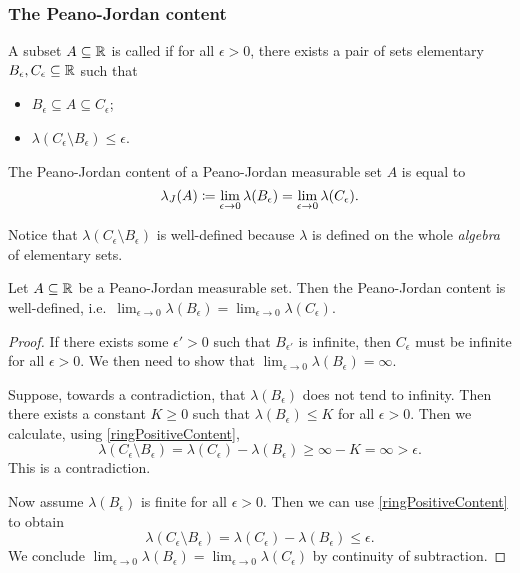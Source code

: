 \subsubsection{The Peano-Jordan content}
\begin{definition}
A subset $A\subseteq \mathbb{R}$ is called  if for all $\epsilon > 0$, there exists a pair of sets elementary $B_\epsilon, C_\epsilon \subseteq \mathbb{R}$ such that
\begin{itemize}
\item $B_\epsilon \subseteq A\subseteq C_\epsilon$;
\item $\lambda(C_\epsilon \setminus B_\epsilon) \leq \epsilon$.
\end{itemize}
The Peano-Jordan content of a Peano-Jordan measurable set $A$ is equal to
\[ \lambda_J(A) \coloneqq \lim_{\epsilon\to 0}\lambda(B_\epsilon) = \lim_{\epsilon\to 0}\lambda(C_\epsilon). \]
\end{definition}
Notice that $\lambda(C_\epsilon \setminus B_\epsilon)$ is well-defined because $\lambda$ is defined on the whole \emph{algebra} of elementary sets.

\begin{lemma}
Let $A\subseteq \mathbb{R}$ be a Peano-Jordan measurable set. Then the Peano-Jordan content is well-defined, i.e.\ $\lim_{\epsilon\to 0}\lambda(B_\epsilon) = \lim_{\epsilon\to 0}\lambda(C_\epsilon)$.
\end{lemma}
\begin{proof}
If there exists some $\epsilon' >0$ such that $B_{\epsilon'}$ is infinite, then $C_\epsilon$ must be infinite for all $\epsilon >0$. We then need to show that $\lim_{\epsilon\to 0}\lambda(B_\epsilon) = \infty$.

Suppose, towards a contradiction, that $\lambda(B_\epsilon)$ does not tend to infinity. Then there exists a constant $K\geq 0$ such that $\lambda(B_\epsilon) \leq K$ for all $\epsilon >0$. Then we calculate, using \ref{ringPositiveContent},
\[ \lambda(C_\epsilon \setminus B_\epsilon) = \lambda(C_\epsilon) - \lambda(B_\epsilon) \geq \infty - K = \infty > \epsilon. \]
This is a contradiction.

Now assume $\lambda(B_\epsilon)$ is finite for all $\epsilon >0$. Then we can use \ref{ringPositiveContent} to obtain
\[ \lambda(C_\epsilon \setminus B_\epsilon) = \lambda(C_\epsilon) - \lambda(B_\epsilon) \leq \epsilon. \]
We conclude $\lim_{\epsilon\to 0}\lambda(B_\epsilon) = \lim_{\epsilon\to 0}\lambda(C_\epsilon)$ by continuity of subtraction.
\end{proof}

